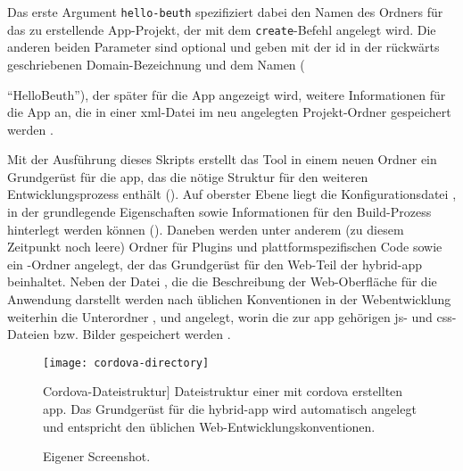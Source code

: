 Das erste Argument \lstinline|hello-beuth| spezifiziert dabei den Namen des Ordners für das zu erstellende App-Projekt, der mit dem \lstinline|create|-Befehl angelegt wird.
Die anderen beiden Parameter sind optional und geben mit der \gls{id} in der rückwärts geschriebenen Domain-Bezeichnung und dem Namen ({\mbox{\enquote{HelloBeuth}}), der später für die App angezeigt wird, weitere Informationen für die App an, die in einer \gls{xml}-Datei im neu angelegten Projekt-Ordner gespeichert werden \cite{Cordova-Docs_CLI}.

Mit der Ausführung dieses Skripts erstellt das Tool in einem neuen Ordner ein Grundgerüst für die \gls{app}, das die nötige Struktur für den weiteren Entwicklungsprozess enthält ().
Auf oberster Ebene liegt die Konfigurationsdatei , in der grundlegende Eigenschaften sowie Informationen für den Build-Prozess hinterlegt werden können ().
Daneben werden unter anderem (zu diesem Zeitpunkt noch leere) Ordner für Plugins und plattformspezifischen Code sowie ein -Ordner angelegt, der das Grundgerüst für den Web-Teil der \gls{hybrid-app} beinhaltet.
Neben der Datei , die die Beschreibung der Web-Oberfläche für die Anwendung darstellt werden nach üblichen Konventionen in der Webentwicklung weiterhin die Unterordner ,  und  angelegt, worin die zur \gls{app} gehörigen \gls{js}- und \gls{css}-Dateien bzw. Bilder gespeichert werden \cite{Cordova-Docs_CLI}.

\begin{figure}
\centering
\texttt{[image: cordova-directory]}
	\caption
	[Cordova-Dateistruktur]
	{Dateistruktur einer mit \gls{cordova} erstellten \gls{app}. Das Grundgerüst für die \gls{hybrid-app} wird automatisch angelegt und entspricht den üblichen Web-Entwicklungskonventionen.}
	\label{fig:cordova-directory}
		\imagesourcefont
		\vspace{\imagesourcespace}
		\imagesourcefont{}
		\caption*{\imagesourcelabel Eigener Screenshot.}
\end{figure}

\par\noindent\begin{minipage}{\linewidth}

\end{minipage}\par\addvspace{\topskip}

}
